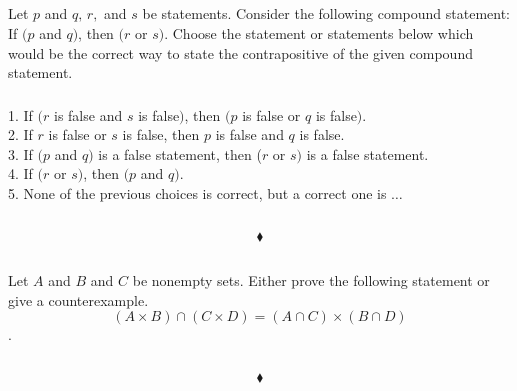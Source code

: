 \subsection{}
Let $p$ and $q,\, r,$ and $s$ be statements. Consider the following compound statement: If $(p$ and $q)$, then $(r$ or $s)$. Choose the statement or statements below which would be the correct way to state the contrapositive of the given compound statement.
\setcounter{secnumdepth}{4}


 \subsubsection{}
\begin{tcolorbox}
1. If $(r$ is false and $s$ is false$)$, then $(p$ is false or $q$ is false$)$.  \\

2. If $r$ is false or $s$ is false, then $p$ is false and $q$ is false.   \\

3. If $(p$ and $q)$ is a false statement, then ($r$ or $s)$ is a false statement. \\

4. If $(r$ or $s)$, then $(p$ and $q)$. \\ 

5. None of the previous choices is correct, but a correct one is  $\dots$
\end{tcolorbox}
$$ $$

$$\blacklozenge$$




\renewcommand{\thesubsection}{\thesection.\RomanNumeralCaps{2}}
\subsection{}
\subsubsection{}
\begin{tcolorbox}
Let $A$ and $B$ and $C$ be nonempty sets. Either prove the following statement or give a counterexample. $$(A\times  B) \cap (C\times D) = (A\cap C) \times (B \cap D)$$.
\end{tcolorbox}
$$ $$

$$\blacklozenge$$


\renewcommand{\thesubsection}{\thesection.\RomanNumeralCaps{3}}
\subsection{}
